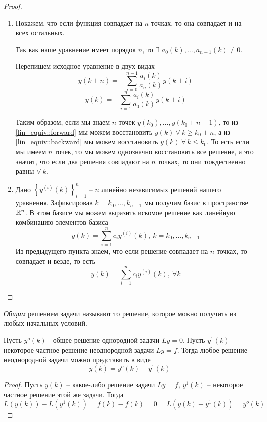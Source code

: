\begin{proof}
  \begin{enumerate}
    \item Покажем, что если функция совпадает на $n$ точках,
          то она совпадает и на всех остальных.

          Так как наше уравнение имеет порядок $n$, то
          $\exists$ ${a_0(k)},\ldots,a_{n-1}(k)\neq0$.

          Перепишем исходное уравнение в двух видах
          \begin{equation}\label{lin_equiv::forward}
            y(k+n)=-\sum_{i=0}^{n-1}\frac{a_i(k)}{a_n(k)}y(k+i)
          \end{equation}
          \begin{equation}\label{lin_equiv::backward}
            y(k)=-\sum_{i=1}^{n}\frac{a_i(k)}{a_0(k)}y(k+i)
          \end{equation}

          Таким образом, если мы знаем $n$ точек $y(k_0),\ldots,y(k_0+n-1)$,
          то из \eqref{lin_equiv::forward} мы можем восстановить $y(k)\ \forall\ k\geq k_0+n$,
          а из \eqref{lin_equiv::backward} мы можем восстановить $y(k)\ \forall\ k\leq k_0$.
          То есть если мы имеем $n$ точек, то мы можем однозначно восстановить
          все решение, а это значит, что если два решения совпадают на
          $n$ точках, то они тождественно равны $\forall\ k$.
    \item Дано $\left\{y^{(i)}(k)\right\}_{i=1}^{n}$ -- $n$
          линейно независимых решений нашего уравнения. Зафиксировав
          $k=k_0,\ldots,k_{n-1}$ мы получим базис в пространстве $\mathbb{R}^n$.
          В этом базисе мы можем выразить искомое решение как линейную
          комбинацию элементов базиса
          \[y(k)=\sum_{i=1}^{n}c_iy^{(i)}(k),\ k=k_0,\ldots,k_{n-1}\]
          Из предыдущего пункта знаем, что если решение совпадает на $n$
          точках, то совпадает и везде, то есть
          \[y(k)=\sum_{i=1}^{n}c_iy^{(i)}(k),\ \forall k\]
  \end{enumerate}
\end{proof}

\begin{definition}
  \textit{Общим} решением задачи называют то решение, которое
  можно получить из любых начальных условий.
\end{definition}

\begin{theorem}
  Пусть $y^o(k)$ - общее решение однородной задачи $Ly=0$.
  Пусть $y^1(k)$ - некоторое частное решение неоднородной
  задачи $Ly=f$. Тогда любое решение неоднородной задачи
  можно представить в виде
  \[y(k)=y^o(k)+y^1(k)\]
\end{theorem}
\begin{proof}
  Пусть $y(k)$ -- какое-либо решение задачи $Ly=f$,
  $y^1(k)$ -- некоторое частное решение этой же задачи. Тогда
  \[L(y(k))-L(y^1(k))=f(k)-f(k)=0=L(y(k)-y^1(k))=y^o(k)\]
\end{proof}
